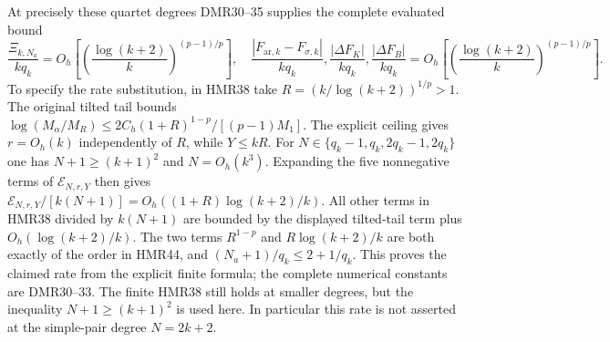 At precisely these quartet degrees DMR30--35 supplies the
complete evaluated bound
\[
 \frac{\Xi_{k,N_a}}{kq_k}
 =O_h\!\left[
 \left(\frac{\log(k+2)}{k}\right)^{(p-1)/p}\right],
 \quad
 \frac{|F_{\mathrm{ar},k}-F_{\sigma,k}|}{kq_k},
 \frac{|\Delta F_K|}{kq_k},\frac{|\Delta F_B|}{kq_k}
 =O_h\!\left[
 \left(\frac{\log(k+2)}{k}\right)^{(p-1)/p}\right].
 \tag{HMR44}
\]
To specify the rate substitution, in HMR38 take
$R=(k/\log(k+2))^{1/p}>1$. The original tilted tail bounds
$\log(M_\alpha/M_R)\leq
2C_h(1+R)^{1-p}/[(p-1)M_1]$. The explicit ceiling gives
$r=O_h(k)$ independently of $R$, while $Y\leq kR$.
For $N\in\{q_k-1,q_k,2q_k-1,2q_k\}$ one has
$N+1\geq(k+1)^2$ and $N=O_h(k^3)$.
Expanding the five nonnegative terms of
$\mathcal E_{N,r,Y}$ then gives
$\mathcal E_{N,r,Y}/[k(N+1)]
=O_h((1+R)\log(k+2)/k)$.
All other terms in HMR38 divided by $k(N+1)$ are bounded
by the displayed tilted-tail term plus
$O_h(\log(k+2)/k)$.
The two terms $R^{1-p}$ and $R\log(k+2)/k$ are both
exactly of the order in HMR44, and $(N_a+1)/q_k\leq2+1/q_k$.
This proves the claimed rate from the explicit finite formula;
the complete numerical constants are DMR30--33.
The finite HMR38 still holds at smaller degrees, but the
inequality $N+1\geq(k+1)^2$ is used here. In particular this
rate is not asserted at the simple-pair degree $N=2k+2$.